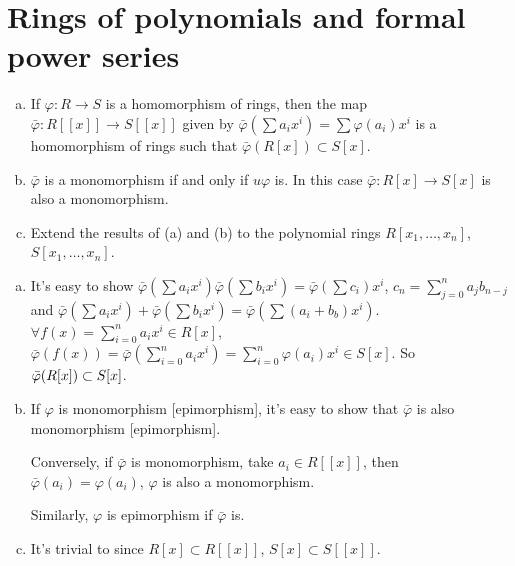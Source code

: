 \section{Rings of polynomials and formal power series}
\begin{ex}
    \begin{enumerate}[(a)]
        \item If $\varphi:R\to S$ is a homomorphism of rings, then the map $\bar{\varphi}:R[[x]]\to S[[x]]$ given by $\bar{\varphi}(\sum a_{i}x^{i})=\sum \varphi(a_{i})x^{i}$ is a homomorphism of rings such that $\bar{\varphi}(R[x])\subset S[x]$.
        \item $\bar{\varphi}$ is a monomorphism if and only if $u\varphi$ is. In this case $\bar{\varphi}:R[x]\to S[x]$ is also a monomorphism.
        \item Extend the results of (a) and (b) to the polynomial rings $R[x_{1},\dots, x_{n}]$, $S[x_{1},\dots,x_{n}]$.
    \end{enumerate}
\end{ex}

\begin{answer}
    \begin{enumerate}[(a)]
        \item It's easy to show $\bar{\varphi}(\sum a_{i}x^{i})\bar{\varphi}(\sum b_{i}x^{i})=\bar{\varphi}(\sum c_{i})x^{i}$, $c_{n}=\sum\limits_{j=0}^{n}a_{j}b_{n-j}$ and $\bar{\varphi}(\sum a_{i}x^{i})+\bar{\varphi}(\sum b_{i}x^{i})=\bar{\varphi}(\sum (a_{i}+b_{b})x^{i})$. $\forall f(x)=\sum\limits_{i=0}^{n}a_{i}x^{i}\in R[x]$, $\bar{\varphi}(f(x))=\bar{\varphi}(\sum\limits_{i=0}^{n}a_{i}x^{i})=\sum\limits_{i=0}^{n}\varphi(a_{i})x^{i}\in S[x]$. So $\bar{\varphi}(R[x])\\\subset S[x]$.
        \item If $\varphi$ is monomorphism [epimorphism], it's easy to show that $\bar{\varphi}$ is also monomorphism [epimorphism].
        
        Conversely, if $\bar{\varphi}$ is monomorphism, take $a_{i}\in R[[x]]$, then $\bar{\varphi}(a_{i})=\varphi(a_{i})$, $\varphi$ is also a monomorphism.

        Similarly, $\varphi$ is epimorphism if $\bar{\varphi}$ is.
        \item It's trivial to since $R[x]\subset R[[x]]$, $S[x]\subset S[[x]]$.
    \end{enumerate}
\end{answer}

$$ $$


